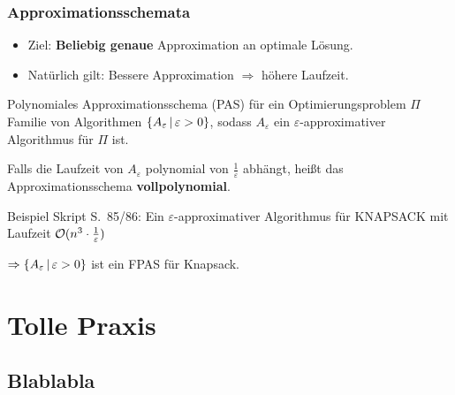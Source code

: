 \begin{frame}
	\frametitle{Approximationsschemata}
	
	\begin{itemize}
		\item Ziel: \textbf{Beliebig genaue} Approximation an optimale Lösung.
		\item Natürlich gilt: Bessere Approximation $\Rightarrow$ höhere Laufzeit.
	\end{itemize}
	
	\pause
	
	\begin{block}{Polynomiales Approximationsschema (PAS) für ein Optimierungsproblem $\Pi$}
		Familie von Algorithmen $\left\lbrace A_\varepsilon \,\middle\vert\, \varepsilon > 0 \right\rbrace$, sodass $A_\varepsilon$ ein $\varepsilon$-approximativer Algorithmus für $\Pi$ ist. \micropause
		
		Falls die Laufzeit von $A_\varepsilon$ polynomial von $\frac{1}{\varepsilon}$ abhängt, heißt das Approximationsschema \textbf{vollpolynomial}.
	\end{block}
	
	\pause
	
	\begin{block}{Beispiel}
		Skript S.\ 85/86: Ein $\varepsilon$-approximativer Algorithmus für KNAPSACK mit Laufzeit $\mathcal{O}(n^3 \cdot \frac{1}{\varepsilon})$ \micropause
		
		$\Rightarrow \left\lbrace A_\varepsilon \,\middle\vert\, \varepsilon > 0 \right\rbrace$ ist ein FPAS für Knapsack.
	\end{block}
\end{frame}

\section{Tolle Praxis}
\subsection{Blablabla}


